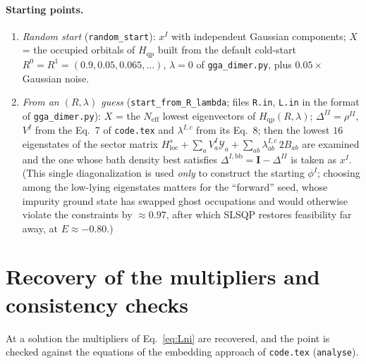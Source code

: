 \documentclass[11pt]{article}
\newcommand{\Neff}{N_{\mathrm{eff}}}
\newcommand{\Hqp}{H_{\mathrm{qp}}}
\newcommand{\Ybb}{\Delta^{I,\mathrm{bb}}}
\begin{document}
\paragraph{Starting points.}
\begin{enumerate}
  \item \emph{Random start} (\texttt{random\_start}): $x^{I}$ with independent Gaussian
    components; $X$ = the occupied orbitals of $\Hqp$ built from the default cold-start
    $R^0=R^1=(0.9,0.05,0.065,\dots)$, $\lambda=0$ of \texttt{gga\_dimer.py}, plus
    $0.05\times$ Gaussian noise.
  \item \emph{From an $(R,\lambda)$ guess} (\texttt{start\_from\_R\_lambda}; files
    \texttt{R.in}, \texttt{L.in} in the format of \texttt{gga\_dimer.py}): $X$ = the
    $\Neff$ lowest eigenvectors of $\Hqp(R,\lambda)$; $\Delta^{II}=\rho^{II}$, $V^I$
    from the Eq.~7 of \texttt{code.tex} and $\lambda^{I,c}$ from its Eq.~8; then the
    lowest $16$ eigenstates of the sector matrix
    $H^{s}_{\mathrm{loc}}+\sum_aV^I_a\mathcal Y_a+\sum_{ab}\lambda^{I,c}_{ab}\,2B_{ab}$
    are examined and the one whose bath density best satisfies
    $\Ybb=\mathbf I-\Delta^{II}$ is taken as $x^I$. (This single diagonalization is used
    \emph{only} to construct the starting $\phi^I$; choosing among the low-lying
    eigenstates matters for the ``forward'' seed, whose impurity ground state has swapped
    ghost occupations and would otherwise violate the constraints by $\approx0.97$, after
    which SLSQP restores feasibility far away, at $E\approx-0.80$.)
\end{enumerate}

\section{Recovery of the multipliers and consistency checks}
\label{sec:kkt}

At a solution the multipliers of Eq.~\eqref{eq:Lni} are recovered, and the point is
checked against the equations of the embedding approach of \texttt{code.tex}
(\texttt{analyse}).
\end{document}
